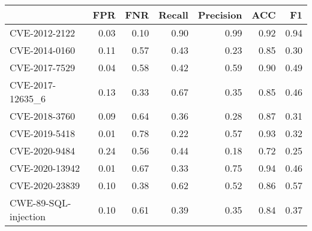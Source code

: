 \begin{tabular}{lrrrrrr}
\toprule
{} &  FPR &  FNR &  Recall &  Precision &  ACC &   F1 \\
\midrule
CVE-2012-2122        & 0.03 & 0.10 &    0.90 &       0.99 & 0.92 & 0.94 \\
CVE-2014-0160        & 0.11 & 0.57 &    0.43 &       0.23 & 0.85 & 0.30 \\
CVE-2017-7529        & 0.04 & 0.58 &    0.42 &       0.59 & 0.90 & 0.49 \\
CVE-2017-12635\_6     & 0.13 & 0.33 &    0.67 &       0.35 & 0.85 & 0.46 \\
CVE-2018-3760        & 0.09 & 0.64 &    0.36 &       0.28 & 0.87 & 0.31 \\
CVE-2019-5418        & 0.01 & 0.78 &    0.22 &       0.57 & 0.93 & 0.32 \\
CVE-2020-9484        & 0.24 & 0.56 &    0.44 &       0.18 & 0.72 & 0.25 \\
CVE-2020-13942       & 0.01 & 0.67 &    0.33 &       0.75 & 0.94 & 0.46 \\
CVE-2020-23839       & 0.10 & 0.38 &    0.62 &       0.52 & 0.86 & 0.57 \\
CWE-89-SQL-injection & 0.10 & 0.61 &    0.39 &       0.35 & 0.84 & 0.37 \\
\bottomrule
\end{tabular}
